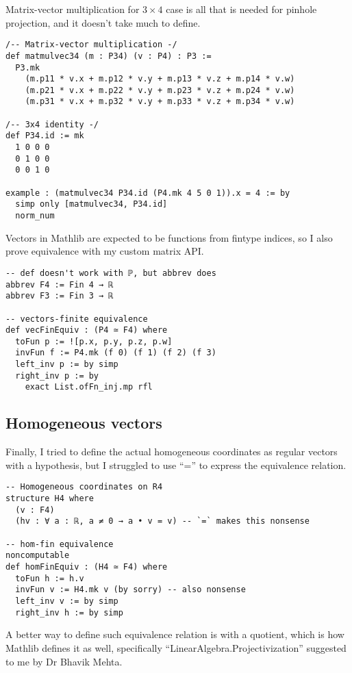 \documentclass[a4paper, 12pt]{article}
\begin{document}
Matrix-vector multiplication for $3\times 4$ case
is all that is needed for pinhole projection,
and it doesn't take much to define.

\begin{lstlisting}
/-- Matrix-vector multiplication -/
def matmulvec34 (m : P34) (v : P4) : P3 :=
  P3.mk
    (m.p11 * v.x + m.p12 * v.y + m.p13 * v.z + m.p14 * v.w)
    (m.p21 * v.x + m.p22 * v.y + m.p23 * v.z + m.p24 * v.w)
    (m.p31 * v.x + m.p32 * v.y + m.p33 * v.z + m.p34 * v.w)

/-- 3x4 identity -/
def P34.id := mk
  1 0 0 0
  0 1 0 0
  0 0 1 0

example : (matmulvec34 P34.id (P4.mk 4 5 0 1)).x = 4 := by
  simp only [matmulvec34, P34.id]
  norm_num
\end{lstlisting}

Vectors in Mathlib are expected to be functions from fintype indices,
so I also prove equivalence with my custom matrix API.

\begin{lstlisting}
-- def doesn't work with ℙ, but abbrev does
abbrev F4 := Fin 4 → ℝ
abbrev F3 := Fin 3 → ℝ

-- vectors-finite equivalence
def vecFinEquiv : (P4 ≃ F4) where
  toFun p := ![p.x, p.y, p.z, p.w]
  invFun f := P4.mk (f 0) (f 1) (f 2) (f 3)
  left_inv p := by simp
  right_inv p := by
    exact List.ofFn_inj.mp rfl
\end{lstlisting}

\subsection*{Homogeneous vectors}

Finally, I tried to define the actual homogeneous coordinates
as regular vectors with a hypothesis,
but I struggled to use ``='' to express the equivalence relation.

\begin{lstlisting}
-- Homogeneous coordinates on R4
structure H4 where
  (v : F4)
  (hv : ∀ a : ℝ, a ≠ 0 → a • v = v) -- `=` makes this nonsense

-- hom-fin equivalence
noncomputable
def homFinEquiv : (H4 ≃ F4) where
  toFun h := h.v
  invFun v := H4.mk v (by sorry) -- also nonsense
  left_inv v := by simp
  right_inv h := by simp
\end{lstlisting}

A better way to define such equivalence relation is with a quotient,
which is how Mathlib defines it as well,
specifically ``LinearAlgebra.Projectivization''
suggested to me by Dr Bhavik Mehta.
\end{document}

